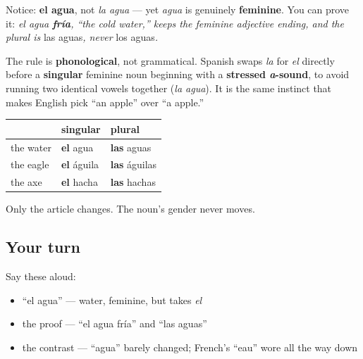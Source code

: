 \begin{grammarlens}[title={Grammar Lens: el agua's article and gender}]
Notice: \textbf{el agua}, not \emph{la agua} — yet \emph{agua} is genuinely \textbf{feminine}. You can prove it: \emph{el agua \textbf{fría}, \textquotedblleft{}the cold water,\textquotedblright{} keeps the feminine adjective ending, and the plural is }las aguas\emph{, never }los aguas\emph{.}

The rule is \textbf{phonological}, not grammatical. Spanish swaps \emph{la} for \emph{el} directly before a \textbf{singular} feminine noun beginning with a \textbf{stressed \emph{a}-sound}, to avoid running two identical vowels together (\emph{la agua}). It is the same instinct that makes English pick \textquotedblleft{}an apple\textquotedblright{} over \textquotedblleft{}a apple.\textquotedblright{}

\noindent
\begin{tabularx}{\linewidth}{@{}>{\raggedright\arraybackslash}X>{\raggedright\arraybackslash}X>{\raggedright\arraybackslash}X@{}}
\toprule
\textbf{} & \textbf{singular} & \textbf{plural} \\
\midrule
the water & \textbf{el} agua & \textbf{las} aguas \\
the eagle & \textbf{el} águila & \textbf{las} águilas \\
the axe & \textbf{el} hacha & \textbf{las} hachas \\
\bottomrule
\end{tabularx}

Only the article changes. The noun's gender never moves.
\end{grammarlens}

\subsection*{Your turn}
Say these aloud:

\begin{itemize}
\raggedright
  \item \textquotedblleft{}el agua\textquotedblright{} — water, feminine, but takes \emph{el}
  \item the proof — \textquotedblleft{}el agua fría\textquotedblright{} and \textquotedblleft{}las aguas\textquotedblright{}
  \item the contrast — \textquotedblleft{}agua\textquotedblright{} barely changed; French's \textquotedblleft{}eau\textquotedblright{} wore all the way down
\end{itemize}

